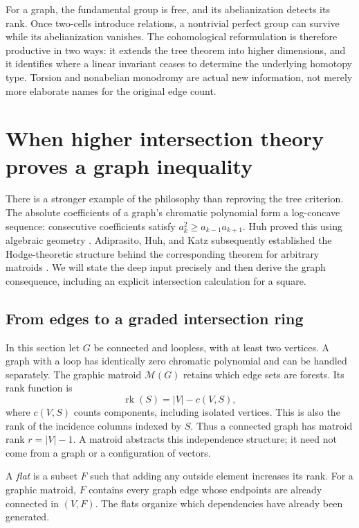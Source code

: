 \documentclass[11pt]{article}
\theoremstyle{definition}
\theoremstyle{remark}
\begin{document}
For a graph, the fundamental group is free, and its abelianization
detects its rank.  Once two-cells introduce relations, a nontrivial
perfect group can survive while its abelianization vanishes.  The
cohomological reformulation is therefore productive in two ways: it
extends the tree theorem into higher dimensions, and it identifies
where a linear invariant ceases to determine the underlying homotopy
type.  Torsion and nonabelian monodromy are actual new information,
not merely more elaborate names for the original edge count.


\section{When higher intersection theory proves a graph inequality}
\label{sec:graph-matroid-hodge}

There is a stronger example of the philosophy than reproving the tree criterion. The absolute coefficients of a graph's chromatic polynomial form a log-concave sequence: consecutive coefficients satisfy $a_k^2\ge a_{k-1}a_{k+1}$. Huh proved this using algebraic geometry \cite{gmhHuh2012}. Adiprasito, Huh, and Katz subsequently established the Hodge-theoretic structure behind the corresponding theorem for arbitrary matroids \cite{gmhAHK2018}. We will state the deep input precisely and then derive the graph consequence, including an explicit intersection calculation for a square.

\subsection{From edges to a graded intersection ring}

In this section let $G$ be connected and loopless, with at least two vertices. A graph with a loop has identically zero chromatic polynomial and can be handled separately. The graphic matroid $\mathcal M(G)$ retains which edge sets are forests. Its rank function is
\[
 \operatorname{rk}(S)=|V|-c(V,S),
\]
where $c(V,S)$ counts components, including isolated vertices. This is also the rank of the incidence columns indexed by $S$. Thus a connected graph has matroid rank $r=|V|-1$. A matroid abstracts this independence structure; it need not come from a graph or a configuration of vectors.

A \emph{flat} is a subset $F$ such that adding any outside element increases its rank. For a graphic matroid, $F$ contains every graph edge whose endpoints are already connected in $(V,F)$. The flats organize which dependencies have already been generated.
\end{document}

